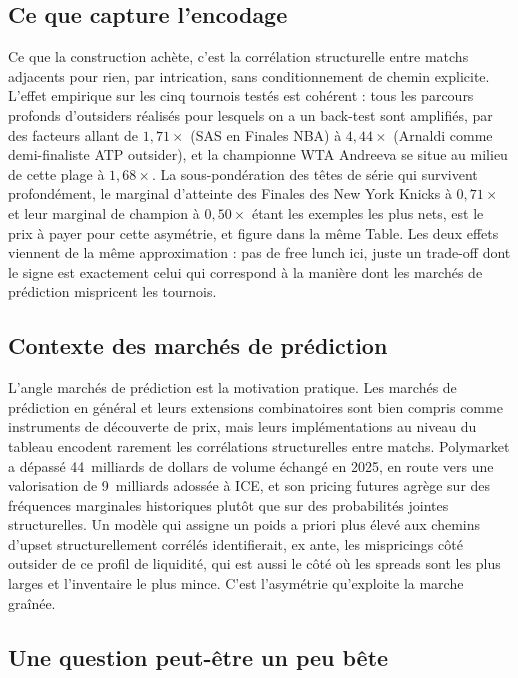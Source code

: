 \documentclass[11pt]{article}
\begin{document}
\subsection{Ce que capture l'encodage}

Ce que la construction achète, c'est la corrélation structurelle
entre matchs adjacents pour rien, par intrication, sans
conditionnement de chemin explicite. L'effet empirique sur les cinq
tournois testés est cohérent : tous les parcours profonds d'outsiders
réalisés pour lesquels on a un back-test sont amplifiés, par des
facteurs allant de $1{,}71\times$ (SAS en Finales NBA) à
$4{,}44\times$ (Arnaldi comme demi-finaliste ATP outsider), et la
championne WTA Andreeva se situe au milieu de cette plage à
$1{,}68\times$. La sous-pondération des têtes de série qui survivent
profondément, le marginal d'atteinte des Finales des New York Knicks
à $0{,}71\times$ et leur marginal de champion à $0{,}50\times$ étant
les exemples les plus nets, est le prix à payer pour cette asymétrie,
et figure dans la même Table. Les deux effets viennent de la même
approximation : pas de free lunch ici, juste un trade-off dont le
signe est exactement celui qui correspond à la manière dont les
marchés de prédiction mispricent les tournois.

\subsection{Contexte des marchés de prédiction}

L'angle marchés de prédiction est la motivation pratique. Les marchés
de prédiction en général \cite{wolfers2004prediction} et leurs
extensions combinatoires \cite{hanson2003combinatorial} sont bien
compris comme instruments de découverte de prix, mais leurs
implémentations au niveau du tableau encodent rarement les
corrélations structurelles entre matchs. Polymarket a dépassé
44~milliards de dollars de volume échangé en 2025, en route vers une
valorisation de 9~milliards adossée à ICE, et son pricing futures
agrège sur des fréquences marginales historiques plutôt que sur des
probabilités jointes structurelles. Un modèle qui assigne un poids a
priori plus élevé aux chemins d'upset structurellement corrélés
identifierait, ex ante, les mispricings côté outsider de ce profil
de liquidité, qui est aussi le côté où les spreads sont les plus
larges et l'inventaire le plus mince. C'est l'asymétrie qu'exploite
la marche graînée.

\subsection{Une question peut-être un peu bête}
\label{sec:candide}
\end{document}
